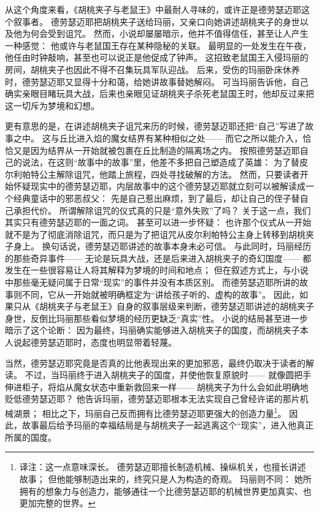 从这个角度来看，《胡桃夹子与老鼠王》中最耐人寻味的，或许正是德劳瑟迈耶这个叙事者。
德劳瑟迈耶把胡桃夹子送给玛丽，又亲口向她讲述胡桃夹子的身世以及他为何会受到诅咒。
然而，小说却屡屡暗示，他并不值得信任，甚至让人产生一种感觉：
他或许与老鼠国王存在某种隐秘的关联。
最明显的一处发生在午夜，他任由时钟敲响，甚至也可以说正是他促成了钟声。
这招致老鼠国王入侵玛丽的房间，胡桃夹子也因此不得不召集玩具军队迎战。
后来，受伤的玛丽卧床休养时，德劳瑟迈耶又显得十分和蔼，给她讲故事替她解闷。
可当玛丽告诉他，自己确实亲眼目睹玩具大战，后来也亲眼见证胡桃夹子杀死老鼠国王时，他却反过来把这一切斥为梦境和幻想。


更有意思的是，在讲述胡桃夹子诅咒来历的时候，德劳瑟迈耶还把“自己”写进了故事之中。
这与丘比进入焰的魔女结界有某种相似之处——
而它之所以能介入，恰恰又是因为结界从一开始就被包裹在丘比制造的隔离场之内。
按照德劳瑟迈耶自己的说法，在这则“故事中的故事”里，他差不多把自己塑造成了英雄：
为了替皮尔利帕特公主解除诅咒，他踏上旅程，四处寻找破解的方法。
然而，只要读者开始怀疑现实中的德劳瑟迈耶，内层故事中的这个德劳瑟迈耶就立刻可以被解读成一个经典童话中的邪恶叔父：
先是自己惹出麻烦，到了最后，却让自己的侄子替自己承担代价。
所谓解除诅咒的仪式真的只是“意外失败”了吗？
关于这一点，我们其实只有德劳瑟迈耶的一面之词。
甚至可以进一步怀疑：
也许那个仪式从一开始就不是为了彻底消除诅咒，而只是为了把诅咒从皮尔利帕特公主身上转移到胡桃夹子身上。
换句话说，德劳瑟迈耶讲述的故事本身未必可信。
与此同时，玛丽经历的那些奇异事件——
无论是玩具大战，还是后来进入胡桃夹子的奇幻国度——
都发生在一些很容易让人将其解释为梦境的时间和地点；
但在叙述方式上，与小说中那些毫无疑问属于日常“现实”的事件并没有本质区别。
而德劳瑟迈耶所讲的故事则不同，它从一开始就被明确框定为“讲给孩子听的、虚构的故事”。
因此，如果只从《胡桃夹子与老鼠王》自身的叙事层级来判断，德劳瑟迈耶讲述的胡桃夹子身世，反倒比玛丽那些看似梦境的经历更缺乏“真实”性。
小说的结局甚至进一步暗示了这个论断：
因为最终，玛丽确实能够进入胡桃夹子的国度，而胡桃夹子本人说起德劳瑟迈耶时，态度也明显带着轻蔑。

当然，德劳瑟迈耶究竟是否真的比他表现出来的更加邪恶，最终仍取决于读者的解读。
不过，当玛丽终于进入胡桃夹子的国度，并使他恢复原貌时——
就像圆把手伸进柜子，将焰从魔女状态中重新救回来一样——
胡桃夹子为什么会如此明确地贬低德劳瑟迈耶？
他告诉玛丽，德劳瑟迈耶根本无法实现自己曾经许诺的那片机械湖景；
相比之下，玛丽自己反而拥有比德劳瑟迈耶更强大的创造力量\footnote{%
    译注：这一点意味深长。
    德劳瑟迈耶擅长制造机械、操纵机关，也擅长讲述故事；
    但他能够制造出来的，终究只是人为构造的奇观。
    玛丽则不同：
    她所拥有的想象力与创造力，能够通往一个比德劳瑟迈耶的机械世界更加真实、也更加完整的世界。
}。
因此，故事最后给予玛丽的幸福结局是与胡桃夹子一起逃离这个“现实”，进入他真正所属的国度。

